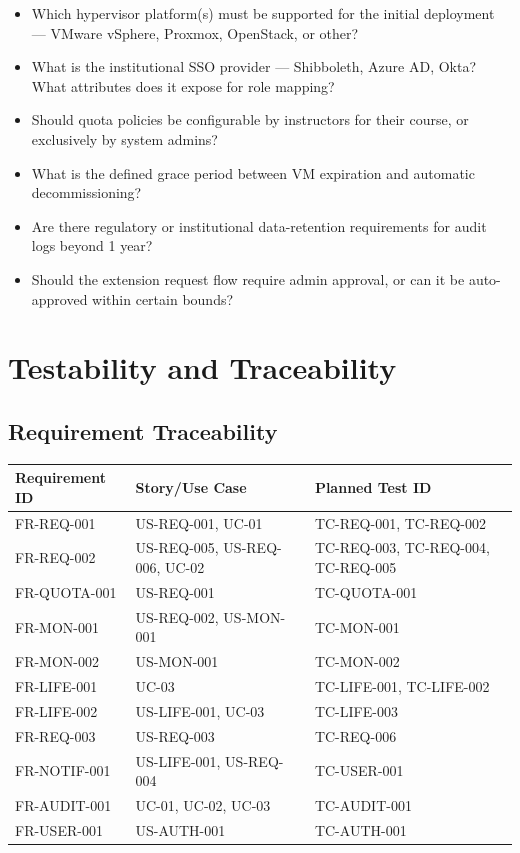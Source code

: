 \documentclass[12pt,letterpaper]{article}
\begin{document}
\begin{itemize}
  \item Which hypervisor platform(s) must be supported for the initial deployment --- VMware vSphere, Proxmox, OpenStack, or other?
  \item What is the institutional SSO provider --- Shibboleth, Azure AD, Okta? What attributes does it expose for role mapping?
  \item Should quota policies be configurable by instructors for their course, or exclusively by system admins?
  \item What is the defined grace period between VM expiration and automatic decommissioning?
  \item Are there regulatory or institutional data-retention requirements for audit logs beyond 1 year?
  \item Should the extension request flow require admin approval, or can it be auto-approved within certain bounds?
\end{itemize}

\section{Testability and Traceability}

\subsection{Requirement Traceability}

\begin{tabularx}{\linewidth}{L{3.5cm} L{5cm} L{5cm}}
  \toprule
  \textbf{Requirement ID} & \textbf{Story/Use Case} & \textbf{Planned Test ID} \\
  \midrule
  FR-REQ-001 & US-REQ-001, UC-01         & TC-REQ-001, TC-REQ-002 \\
  FR-REQ-002 & US-REQ-005, US-REQ-006, UC-02 & TC-REQ-003, TC-REQ-004, TC-REQ-005 \\
  FR-QUOTA-001 & US-REQ-001                & TC-QUOTA-001 \\
  FR-MON-001 & US-REQ-002, US-MON-001    & TC-MON-001 \\
  FR-MON-002 & US-MON-001                & TC-MON-002 \\
  FR-LIFE-001 & UC-03                     & TC-LIFE-001, TC-LIFE-002 \\
  FR-LIFE-002 & US-LIFE-001, UC-03         & TC-LIFE-003 \\
  FR-REQ-003 & US-REQ-003                & TC-REQ-006 \\
  FR-NOTIF-001 & US-LIFE-001, US-REQ-004    & TC-USER-001 \\
  FR-AUDIT-001 & UC-01, UC-02, UC-03       & TC-AUDIT-001 \\
  FR-USER-001 & US-AUTH-001                & TC-AUTH-001 \\
  \bottomrule
\end{tabularx}
\end{document}
